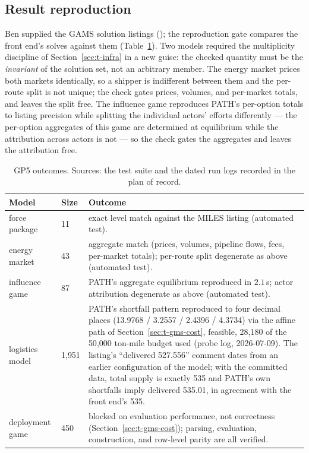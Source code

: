 \subsection{Result reproduction}

Ben supplied the GAMS solution listings (); the
reproduction gate compares the front end's solves against them
(Table~\ref{tab:gms-repro}). Two models required the multiplicity
discipline of Section~\ref{sec:t-infra} in a new guise: the checked
quantity must be the \emph{invariant} of the solution set, not an
arbitrary member. The energy market prices both markets identically, so
a shipper is indifferent between them and the per-route split is not
unique; the check gates prices, volumes, and per-market totals, and
leaves the split free. The influence game reproduces PATH's per-option
totals to listing precision while splitting the individual actors'
efforts differently --- the per-option aggregates of this game are
determined at equilibrium while the attribution across actors is not ---
so the check gates the aggregates and leaves the attribution free.

\begin{table}[htbp]
\centering
\small
\begin{tabular}{p{} p{} p{}}
\toprule
\textbf{Model} & \textbf{Size} & \textbf{Outcome} \\
\midrule
force package & 11 & exact level match against the MILES listing
  (automated test). \\
energy market & 43 & aggregate match (prices, volumes, pipeline flows,
  fees, per-market totals); per-route split degenerate as above
  (automated test). \\
influence game & 87 & PATH's aggregate equilibrium reproduced in
  $2.1$\,s; actor attribution degenerate as above (automated test). \\
logistics model & 1{,}951 & PATH's shortfall pattern reproduced to four
  decimal places (13.9768 / 3.2557 / 2.4396 / 4.3734) via the affine path
  of Section~\ref{sec:t-gms-cost}, feasible, 28{,}180 of the 50{,}000
  ton-mile budget used (probe log, 2026-07-09). The listing's
  ``delivered 527.556'' comment dates from an earlier configuration of
  the model; with the committed data, total supply is exactly 535 and
  PATH's own shortfalls imply delivered 535.01, in agreement with the
  front end's 535. \\
deployment game & 450 & blocked on evaluation performance, not
  correctness (Section~\ref{sec:t-gms-cost}); parsing, evaluation,
  construction, and row-level parity are all verified. \\
\bottomrule
\end{tabular}
\caption{GP5 outcomes. Sources: the  test suite and the
dated  run logs recorded in the plan of record.}
\label{tab:gms-repro}
\end{table}


